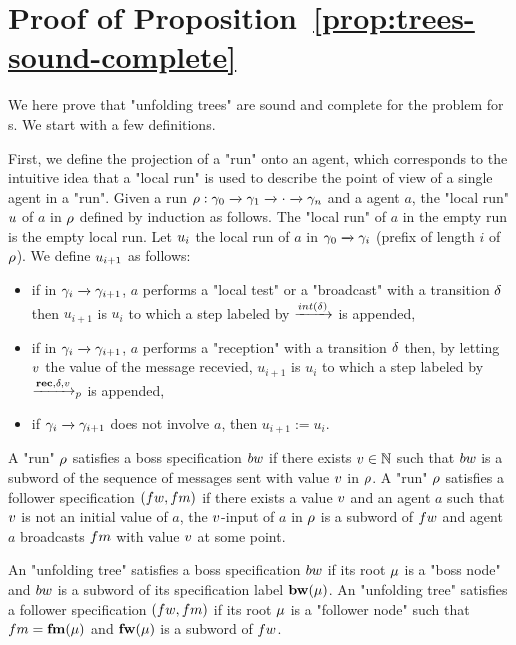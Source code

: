 \section{Proof of Proposition~\ref{prop:trees-sound-complete}}
\label{app:trees-sound-complete}

We here prove that "unfolding trees" are sound and complete for the \COVER problem for \BNRA{}s. 
We start with a few definitions. 

First, we define the projection of a "run" onto an agent, which corresponds to the intuitive idea that a "local run" is used to describe the point of view of a single agent in a "run". Given a run $\rho: \gamma_0 \xrightarrow{} \gamma_1 \xrightarrow{} \cdot \xrightarrow{}\gamma_n$ and a agent $a$, the "local run" $u$ of $a$ in $\rho$ defined by induction as follows. The "local run" of $a$ in the empty run is the empty local run. Let $u_i$ the local run of $a$ in $\gamma_0 \xrightarrow{} \gamma_i$ (prefix of length $i$ of $\rho$). We define $u_{i+1}$ as follows:
\begin{itemize}
\item if in $\gamma_i \xrightarrow{} \gamma_{i+1}$, $a$ performs a "local test" or a "broadcast" with a transition $\delta$ then $u_{i+1}$ is $u_i$ to which a step labeled by $\intstep{\atrans}$ is appended,
\item if in $\gamma_i \xrightarrow{} \gamma_{i+1}$, $a$ performs a "reception" with a transition $\delta$ then, by letting $v$ the value of the message recevied, $u_{i+1}$ is $u_i$ to which a step labeled by $\xrightarrow{\textbf{rec}, \delta, v}_{p}$ is appended,
\item if $\gamma_i \xrightarrow{} \gamma_{i+1}$ does not involve $a$, then $u_{i+1} := u_i$.
\end{itemize}

A "run" $\rho$ satisfies a boss specification $\bossspec$ if there exists $v \in \mathbb{N}$ such that $\bossspec$ is a subword of the sequence of messages sent with value $v$ in $\rho$.
A "run" $\rho$ satisfies a follower specification $(\followwordspec, \followmessagespec)$ if there exists a value $v$ and an agent $a$ such that $v$ is not an initial value of $a$, the $v$-input of $a$ in $\rho$ is a subword of $\followwordspec$ and agent $a$ broadcasts $\followmessagespec$ with value $v$ at some point.

An "unfolding tree" satisfies a boss specification $\bossspec$ if its root $\mu$ is a "boss node" and $\bossspec$ is a subword of its specification label $\mathbf{bw}(\mu)$.
An "unfolding tree" satisfies a follower specification $(\followwordspec, \followmessagespec)$ if its root $\mu$ is a "follower node" such that $\followmessagespec=\followlabelmessage{\node}$ and  $\mathbf{fw}(\mu)$ is a subword of $\followwordspec$.


